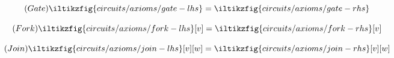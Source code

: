 \begin{figure}[p]
    \centering
    \begin{minipage}[b]{0.28\textwidth}
        \begin{equation}
            \tag{\(\mathsf{Gate}\)}
            \iltikzfig{circuits/axioms/gate-lhs}
            =
            \iltikzfig{circuits/axioms/gate-rhs}
            \label{eq:gate}
        \end{equation}
    \end{minipage}%
    \begin{minipage}[b]{0.24\textwidth}
        \begin{equation}\textbf{}
            \tag{\(\mathsf{Fork}\)}
            \iltikzfig{circuits/axioms/fork-lhs}[v]
            =
            \iltikzfig{circuits/axioms/fork-rhs}[v]
            \label{eq:fork}
        \end{equation}
    \end{minipage}%
    \begin{minipage}[b]{0.25\textwidth}
        \begin{equation}
            \tag{\(\mathsf{Join}\)}
            \iltikzfig{circuits/axioms/join-lhs}[v][w]
            =
            \iltikzfig{circuits/axioms/join-rhs}[v][w]
            \label{eq:join}
        \end{equation}
    \end{minipage}


\end{figure}
